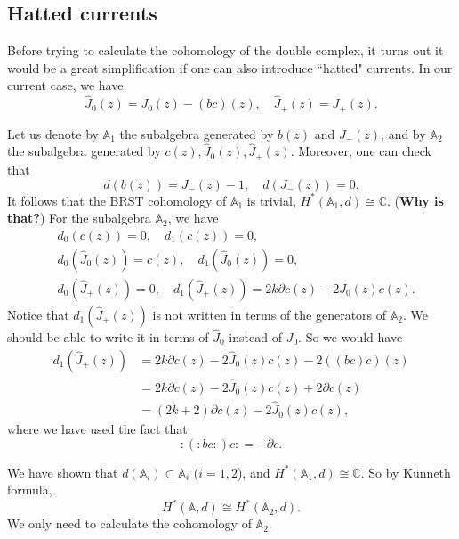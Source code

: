 \documentclass[a4paper,11pt]{article}
\begin{document}
\subsection{Hatted currents}
Before trying to calculate the cohomology of the double complex, it turns out it would be a great simplification if one can also introduce ``hatted" currents.
In our current case, we have
\begin{equation}
    \hat{J}_0 (z) = J_0(z) - (bc)(z),\quad \hat{J}_+(z) = J_+(z).
\end{equation}

Let us denote by $\mathbb{A}_1$ the subalgebra generated by $b(z)$ and $J_-(z)$, and by $\mathbb{A}_2$ the subalgebra generated by $c(z), \hat{J}_0(z), \hat{J}_+(z)$. Moreover, one can check that
\begin{equation}
    d(b(z)) = J_-(z) - 1, \quad d(J_-(z)) = 0.
\end{equation}
It follows that the BRST cohomology of $\mathbb{A}_1$ is trivial, $H^*(\mathbb{A}_1, d) \cong \mathbb{C}$. (\textbf{Why is that?}) For the subalgebra $\mathbb{A}_2$, we have
\begin{equation}\label{eqn:diff-result}
\begin{aligned}
    &d_0(c(z)) = 0, \quad d_1(c(z)) = 0,\\
    &d_0(\hat{J}_0(z)) = c(z), \quad d_1(\hat{J}_0(z)) = 0,\\
    &d_0(\hat{J}_+(z)) = 0, \quad d_1(\hat{J}_+(z)) = 2 k \partial c(z) - 2J_0(z) c(z).
\end{aligned}
\end{equation}
Notice that $d_1(\hat{J}_+(z))$ is not written in terms of the generators of $\mathbb{A}_2$. We should be able to write it in terms of $\hat{J}_0$ instead of $J_0$. So we would have
\begin{equation}
\begin{aligned}
    d_1(\hat{J}_+(z)) &= 2k \partial c(z) - 2\hat{J}_0(z) c(z) -2((bc)c)(z)\\
    &= 2k \partial c(z) - 2\hat{J}_0(z) c(z) + 2 \partial c(z)\\
    &= (2k+2) \partial c(z) - 2 \hat{J}_0(z)c(z),
\end{aligned}
\end{equation}
where we have used the fact that
\begin{equation}
    :(:bc:)c: = -\partial c.
\end{equation}


We have shown that $d(\mathbb{A}_i) \subset \mathbb{A}_i$ ($i=1,2$), and $H^*(\mathbb{A}_1, d) \cong \mathbb{C}$. So by K\"{u}nneth formula,
\begin{equation}
    H^*(\mathbb{A},d) \cong H^*(\mathbb{A}_2, d).
\end{equation}
We only need to calculate the cohomology of $\mathbb{A}_2$.
\end{document}
